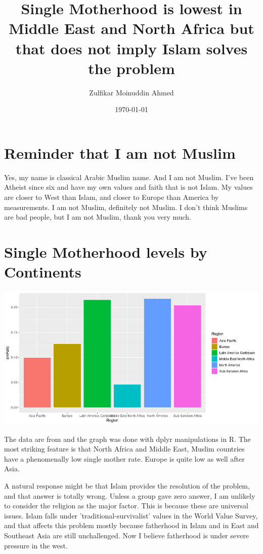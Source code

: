 \documentclass{amsart}
\title{Single Motherhood is lowest in Middle East and North Africa but that does not imply Islam solves the problem}
\author{Zulfikar Moinuddin Ahmed}
\date{\today}
\begin{document}
\maketitle

\section{Reminder that I am not Muslim}
Yes, my name is classical Arabic Muslim name.  And I am not Muslim. I've been Atheist since six and have my own values and faith that is not Islam.  My values are closer to West than Islam, and closer to Europe than America by measurements.  I am not Muslim, definitely not Muslim.  I don't think Muslims are bad people, but I am not Muslim, thank you very much.

\section{Single Motherhood levels by Continents}

\includegraphics[scale=0.45]{smc.png}

The data are from \cite{PR} and the graph was done with dplyr manipulations in R.  The most striking feature is that North Africa and Middle East, Muslim countries have a phenomenally low single mother rate.  Europe is quite low as well after Asia.  

A natural response might be that Islam provides the resolution of the problem, and that answer is totally wrong.  Unless a group gave zero answer, I am unlikely to consider the religion as the major factor.  This is because these are universal issues.  Islam falls under 'traditional-survivalist' values in the World Value Survey, and that affects this problem mostly because fatherhood in Islam and in East and Southeast Asia are still unchallenged.  Now I believe fatherhood is under severe pressure in the west.  


\begin{thebibliography}{CCC}
\end{thebibliography}
\end{document}
